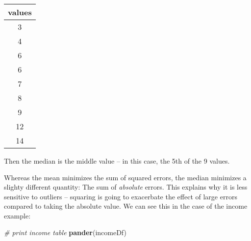 \documentclass[]{book}
\newenvironment{Shaded}{\begin{snugshade}}{\end{snugshade}}
\newcommand{\KeywordTok}[1]{\textcolor[rgb]{0.13,0.29,0.53}{\textbf{#1}}}
\newcommand{\CommentTok}[1]{\textcolor[rgb]{0.56,0.35,0.01}{\textit{#1}}}
\newcommand{\NormalTok}[1]{#1}
\theoremstyle{definition}
\theoremstyle{definition}
\theoremstyle{definition}
\theoremstyle{remark}
\begin{document}
\begin{longtable}[]{@{}c@{}}
\toprule
\begin{minipage}[b]{0.11\columnwidth}\centering\strut
values\strut
\end{minipage}\tabularnewline
\midrule
\endhead
\begin{minipage}[t]{0.11\columnwidth}\centering\strut
3\strut
\end{minipage}\tabularnewline
\begin{minipage}[t]{0.11\columnwidth}\centering\strut
4\strut
\end{minipage}\tabularnewline
\begin{minipage}[t]{0.11\columnwidth}\centering\strut
6\strut
\end{minipage}\tabularnewline
\begin{minipage}[t]{0.11\columnwidth}\centering\strut
6\strut
\end{minipage}\tabularnewline
\begin{minipage}[t]{0.11\columnwidth}\centering\strut
7\strut
\end{minipage}\tabularnewline
\begin{minipage}[t]{0.11\columnwidth}\centering\strut
8\strut
\end{minipage}\tabularnewline
\begin{minipage}[t]{0.11\columnwidth}\centering\strut
9\strut
\end{minipage}\tabularnewline
\begin{minipage}[t]{0.11\columnwidth}\centering\strut
12\strut
\end{minipage}\tabularnewline
\begin{minipage}[t]{0.11\columnwidth}\centering\strut
14\strut
\end{minipage}\tabularnewline
\bottomrule
\end{longtable}

Then the median is the middle value -- in this case, the 5th of the 9
values.

Whereas the mean minimizes the sum of squared errors, the median
minimizes a slighty different quantity: The sum of \emph{absolute}
errors. This explains why it is less sensitive to outliers -- squaring
is going to exacerbate the effect of large errors compared to taking the
absolute value. We can see this in the case of the income example:

\begin{Shaded}
\begin{Highlighting}[]
\CommentTok{# print income table}
\KeywordTok{pander}\NormalTok{(incomeDf)}
\end{Highlighting}
\end{Shaded}
\end{document}
